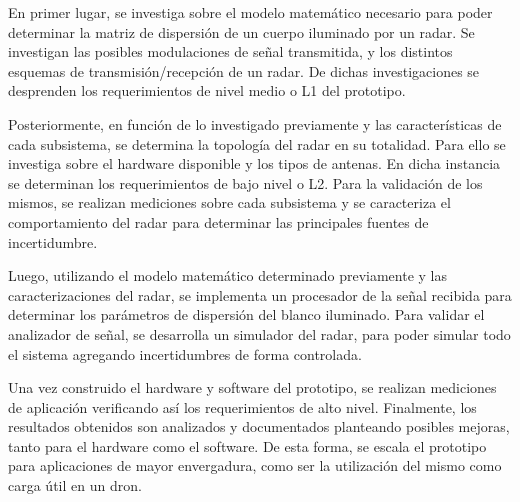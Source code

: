 En primer lugar, se investiga sobre el modelo matemático necesario para poder determinar la matriz de dispersión de un cuerpo iluminado por un radar. Se investigan las posibles modulaciones de señal transmitida, y los distintos esquemas de transmisión/recepción de un radar. De dichas investigaciones se desprenden los requerimientos de nivel medio o L1 del prototipo.


Posteriormente, en función de lo investigado previamente y las características de cada subsistema, se determina la topología del radar en su totalidad. Para ello se investiga sobre el hardware disponible y los tipos de antenas. En dicha instancia se determinan los requerimientos de bajo nivel o L2. Para la validación de los mismos, se realizan mediciones sobre cada subsistema y se caracteriza el comportamiento del radar para determinar las principales fuentes de incertidumbre.

Luego, utilizando el modelo matemático determinado previamente y las caracterizaciones del radar, se implementa un procesador de la señal recibida para determinar los parámetros de dispersión del blanco iluminado. Para validar el analizador de señal, se desarrolla un simulador del radar, para poder simular todo el sistema agregando incertidumbres de forma controlada.


Una vez construido el hardware y software del prototipo, se realizan mediciones de aplicación verificando así los requerimientos de alto nivel. Finalmente, los resultados obtenidos son analizados y documentados planteando posibles mejoras, tanto para el hardware como el software. De esta forma, se escala el prototipo para aplicaciones de mayor envergadura, como ser la utilización del mismo como carga útil en un dron.

